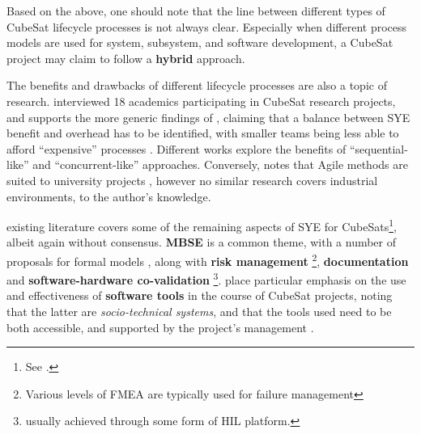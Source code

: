 \documentclass[a4paper,nobib,justified,final]{tufte-book}
\begin{document}
Based on the above, one should note that the line between different types of CubeSat lifecycle processes is not always clear. Especially when different process models are used for system, subsystem, and software development, a CubeSat project may claim to follow a \textbf{hybrid} approach.


The benefits and drawbacks of different lifecycle processes are also a topic of research.
\citeauthor{honore-livermoreAcademicsPerceptionSystems2022} interviewed 18 academics participating in CubeSat research projects, and supports the more generic findings of , claiming that a balance between \acs{SYE} benefit and overhead has to be identified, with smaller teams being less able to afford ``expensive'' processes \autocite{honore-livermoreAcademicsPerceptionSystems2022}. 
Different works explore the benefits of ``sequential-like'' \autocite{shiotaniEndtoEndDesignDevelopment2014,sanchoLessonsLearnedFYS2021,deckerSystemsengineeringAssessmentMultiple2016} and ``concurrent-like'' \autocite{labargeCubeSatAgileSystem2014,garzanitiEffectivenessScrumMethodology2019,segretPavingStonesInitial2014} approaches. Conversely, \citeauthor{honore-livermoreIntegratingAgileSystems2022} notes that Agile methods are suited to university projects \autocite{honore-livermoreIntegratingAgileSystems2022}, however no similar research covers industrial environments, to the author's knowledge.

 existing literature covers some of the remaining aspects of \acl{SYE} for CubeSats\footnote{See .}, albeit again without consensus. \textbf{\acl{MBSE}} is a common theme, with a number of proposals for formal models \autocite{gateauOpensourceFrameworkConcurrent2021,strobbeOpensourceCubeSatMBSE2023}, along with \textbf{risk management} \cite{honore-livermoreIntegratingAgileSystems2022}\footnote{Various levels of \acs{FMEA} are typically used for failure management}, \textbf{documentation} \autocite{nieto-peroyCubeSatMissionDesign2019} and \textbf{software-hardware co-validation} \autocite{honore-livermoreIntegratingAgileSystems2022,kiesbyeHardwareInTheLoopSoftwareInTheLoopTesting2019}\footnote{usually achieved through some form of \acf{HIL} platform.}. \citeauthor{honore-livermoreManagingProductDevelopment2021} place particular emphasis on the use and effectiveness of \textbf{software tools} in the course of CubeSat projects, noting that the latter are \emph{socio-technical systems}, and that the tools used need to be both accessible, and supported by the project's management \autocite{honore-livermoreManagingProductDevelopment2021}.
\end{document}
